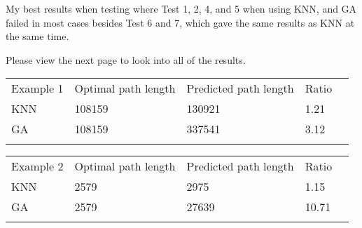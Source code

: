 \documentclass[onecolumn, draftclsnofoot,10pt, compsoc]{IEEEtran}
\begin{document}
My best results when testing where Test 1, 2, 4, and 5 when using KNN, and GA failed in most cases besides Test 6 and 7, which gave the same results as KNN at the same time.


Please view the next page to look into all of the results.

\newpage
\begin{table}[]
\begin{tabular}{lllll}
\cline{1-4}
\multicolumn{1}{|l|}{Example 1}    & \multicolumn{1}{l|}{Optimal path length} & \multicolumn{1}{l|}{Predicted path length} & \multicolumn{1}{l|}{Ratio} &  \\ \cline{1-4}
\multicolumn{1}{|l|}{KNN} & \multicolumn{1}{l|}{108159}                    & \multicolumn{1}{l|}{130921}                      & \multicolumn{1}{l|}{1.21}      &  \\ \cline{1-4}
\multicolumn{1}{|l|}{GA}  & \multicolumn{1}{l|}{108159}                    & \multicolumn{1}{l|}{337541}                      & \multicolumn{1}{l|}{3.12}      &  \\ \cline{1-4}
                          &                                          &                                            &                            & 
\end{tabular}
\end{table}
\begin{table}[]
\begin{tabular}{lllll}
\cline{1-4}
\multicolumn{1}{|l|}{Example 2}    & \multicolumn{1}{l|}{Optimal path length} & \multicolumn{1}{l|}{Predicted path length} & \multicolumn{1}{l|}{Ratio} &  \\ \cline{1-4}
\multicolumn{1}{|l|}{KNN} & \multicolumn{1}{l|}{2579}                    & \multicolumn{1}{l|}{2975}                      & \multicolumn{1}{l|}{1.15}      &  \\ \cline{1-4}
\multicolumn{1}{|l|}{GA}  & \multicolumn{1}{l|}{2579}                    & \multicolumn{1}{l|}{27639}                      & \multicolumn{1}{l|}{10.71}      &  \\ \cline{1-4}
                          &                                          &                                            &                            & 
\end{tabular}
\end{table}
\end{document}
